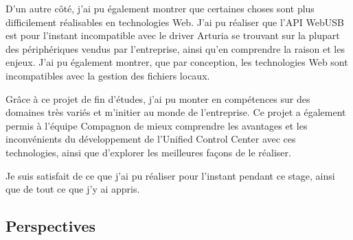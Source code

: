 \documentclass[francais]{rapportPFE}  %
\begin{document}
D'un autre côté, j'ai pu également montrer que certaines choses sont plus difficilement réalisables en technologies Web. J'ai pu réaliser que l'API WebUSB est pour l'instant incompatible avec le driver Arturia se trouvant sur la plupart des périphériques vendus par l'entreprise, ainsi qu'en comprendre la raison et les enjeux. J'ai pu également montrer, que par conception, les technologies Web sont incompatibles avec la gestion des fichiers locaux.

Grâce à ce projet de fin d'études, j'ai pu monter en compétences sur des domaines très variés et m'initier au monde de l'entreprise. Ce projet a également permis à l'équipe Compagnon de mieux comprendre les avantages et les inconvénients du développement de l'Unified Control Center avec ces technologies, ainsi que d'explorer les meilleures façons de le réaliser.

Je suis satisfait de ce que j'ai pu réaliser pour l'instant pendant ce stage, ainsi que de tout ce que j'y ai appris.


\subsection{Perspectives}
\end{document}
